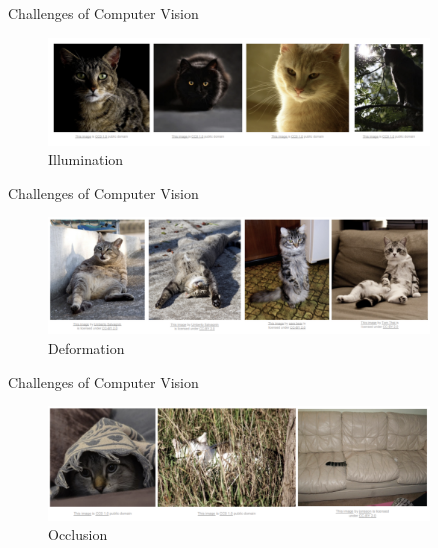 \begin{frame}{Challenges of Computer Vision}
\begin{figure}
    \centering
    \includegraphics[width=0.9\textwidth]{img/illumination.png}
    \caption{Illumination}
\end{figure}
\end{frame}

\begin{frame}{Challenges of Computer Vision}
\begin{figure}
    \centering
    \includegraphics[width=0.9\textwidth]{img/deformation.png}
    \caption{Deformation}
\end{figure}
\end{frame}

\begin{frame}{Challenges of Computer Vision}
\begin{figure}
    \centering
    \includegraphics[width=0.9\textwidth]{img/hiding.png}
    \caption{Occlusion}
\end{figure}
\end{frame}